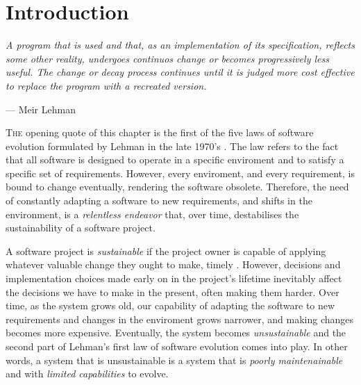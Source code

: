 \chapter{Introduction}\label{chap:introduction}

\epigraph{\emph{A program that is used and that, as an implementation of its specification, reflects some other reality, undergoes continuos change or becomes progressively less useful.
The change or decay process continues until it is judged more cost effective to replace the program with a recreated version.}}{--- Meir Lehman}

\lettrine{T}{he} opening quote of this chapter is the first of the five laws of software evolution formulated by Lehman in the late 1970's \cite{Lehman1979}.
The law refers to the fact that all software is designed to operate in a specific enviroment and to satisfy a specific set of requirements. 
However, every enviroment, and every requirement, is bound to change eventually, rendering the software obsolete. %
Therefore, the need of constantly adapting a software to new requirements, and shifts in the environment, is a \emph{relentless endeavor} that, over time, destabilises the sustainability of a software project.

A software project is \emph{sustainable} if the project owner is capable of applying whatever valuable change they ought to make, timely \cite{Winters2020}.
However, decisions and implementation choices made early on in the project's lifetime inevitably affect the decisions we have to make in the present, often making them harder.
Over time, as the system grows old, our capability of adapting the software to new requirements and changes in the enviroment grows narrower, and making changes becomes more expensive.
Eventually, the system becomes \emph{unsustainable} and the second part of Lehman's first law of software evolution comes into play.
In other words, a system that is unsustainable is a system that is \emph{poorly maintenainable} and with \emph{limited capabilities} to evolve. 

